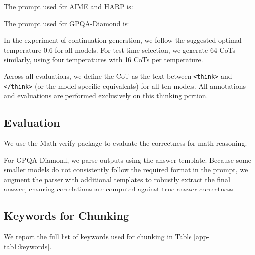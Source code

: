 The prompt used for AIME and HARP is:


The prompt used for GPQA-Diamond is:


In the experiment of continuation generation, we follow the suggested optimal temperature 0.6 for all models. For test-time selection, we generate 64 CoTs similarly, using four temperatures with 16 CoTs per temperature.

Across all evaluations, we define the CoT as the text between \texttt{<think>} and \texttt{</think>} (or the model-specific equivalents) for all ten models. All annotations and evaluations are performed exclusively on this thinking portion.

\subsection{Evaluation}

We use the Math-verify package \citep{Math-Verify} to evaluate the correctness for math reasoning.

For GPQA-Diamond, we parse outputs using the answer template. Because some smaller models do not consistently follow the required format in the prompt, we augment the parser with additional templates to robustly extract the final answer, ensuring correlations are computed against true answer correctness.

\subsection{Keywords for Chunking}

We report the full list of keywords used for chunking in Table \ref{app-tab1:keywords}.

